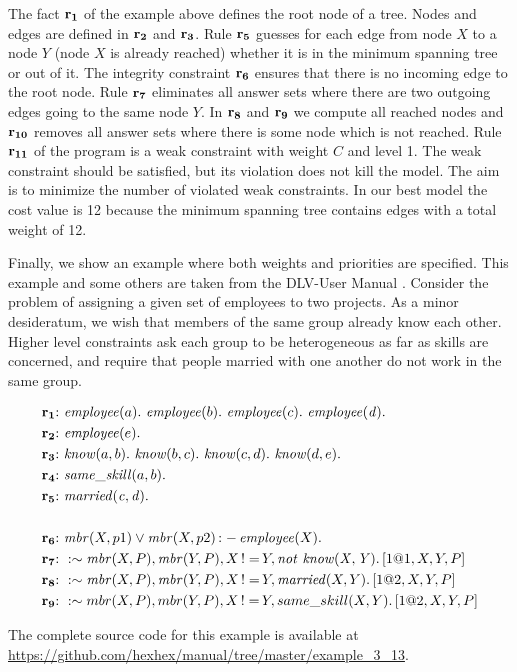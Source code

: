 \documentclass[a4paper, titlepage]{article}
\DeclareMathOperator{\leftimpl}{:-}
\DeclareMathOperator{\nott}{\mathit{not}}
\DeclareMathOperator{\noteq}{!=}
\newcommand{\examplelink}[1]{\url{https://github.com/hexhex/manual/tree/master/#1}}
\newcommand{\row}[1]{%
  \ensuremath{\color{black}\ensuremath{\mathbf{#1}} \color{black}}%
}
\newcommand{\rowprefix}[1]{%
  \ensuremath{\color{black}\mathbf{#1{:}}\ }%
}
\begin{document}
The fact $\row{r_1}$ of the example above defines the root node 
of a tree. Nodes and edges are defined in $\row{r_2}$ and $\row{r_3}$. 
Rule $\row{r_5}$ guesses for each edge from node 
$X$ to a node $Y$ (node $X$ is already reached) whether it is in the minimum spanning 
tree or out of it. The integrity constraint $\row{r_6}$ ensures 
that there is no incoming edge to the root node. Rule $\row{r_7}$ 
eliminates all answer sets where there are two outgoing 
edges going to the same node $Y$. In $\row{r_8}$ and $\row{r_9}$ 
we compute all reached nodes and $\row{r_{10}}$ removes all answer sets where there is some node 
which is not reached. Rule $\row{r_{11}}$ of the program is a weak 
constraint with weight $C$ and level 1. The weak constraint 
should be satisfied, but its violation does not kill the 
model. The aim is to minimize the number of violated weak 
constraints. In our best model the cost value is 12 because the minimum spanning tree contains edges with a total weight of 12.  


Finally, we show an example where both weights and 
priorities are specified. This example and some others are 
taken from the DLV-User Manual \cite{brfwilvpg2009}. Consider the 
problem of assigning a given set of employees to two 
projects. As a minor desideratum, we wish that members of 
the same group already know each other. Higher level 
constraints ask each group to be heterogeneous as far as 
skills are concerned, and require that people married with 
one another do not work in the same group.
\begin{exmp}
\begin{align*}
\rowprefix{r_1}& \mathit{employee}(a). \ \mathit{employee}(b). \ 
\mathit{employee}(c). \ \mathit{employee(d)}. \ \\
\rowprefix{r_2}& \mathit{employee}(e). \\
\rowprefix{r_3}& \mathit{know}(a,b). \ \mathit{know}(b,c). \ 
\mathit{know}(c,d). \ \mathit{know}(d,e). \ \\
\rowprefix{r_4}& \mathit{same\_skill}(a,b). \\
\rowprefix{r_5}& \mathit{married(c,d)}. \\
\\ 
\rowprefix{r_6}& \mathit{mbr}(X,p1) \vee \mathit{mbr}(X,p2) 
\leftimpl \mathit{employee}(X).\\
\rowprefix{r_7}& :\sim \mathit{mbr}(X,P), \mathit{mbr}
(Y,P), X \noteq Y, \nott \thinspace \mathit{know(X,Y)}. \thinspace [1@1, X,Y,P]\\
\rowprefix{r_8}& : \sim \mathit{mbr}(X,P), \mathit{mbr}
(Y,P), X \noteq Y, \mathit{married}(X,Y). \thinspace [1@2, X,Y,P]\\
\rowprefix{r_9}& : \sim mbr(X,P), mbr(Y,P), X \noteq Y, 
same\_skill(X,Y). \thinspace [1@2, X,Y,P] 
\end{align*}
\end{exmp}
The complete source code for this example is available at \examplelink{example_3_13}.
\end{document}
